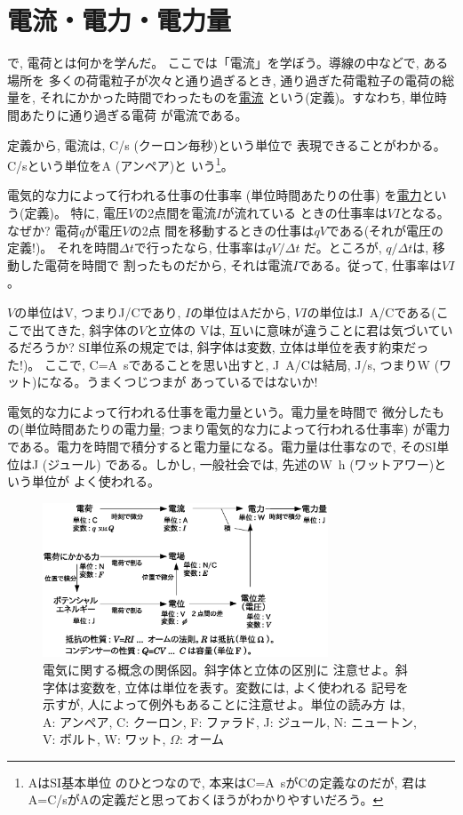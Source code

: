 \section{電流・電力・電力量}

で, 電荷とは何かを学んだ。
ここでは「電流」を学ぼう。導線の中などで, ある場所を
多くの荷電粒子が次々と通り過ぎるとき, 通り過ぎた荷電粒子の電荷の総量を, 
それにかかった時間でわったものを\underline{電流}
という(定義)。すなわち, 単位時間あたりに通り過ぎる電荷
が電流である。

定義から, 電流は, C/s (クーロン毎秒)という単位で
表現できることがわかる。C/sという単位をA (アンペア)と
いう\footnote{AはSI基本単位
のひとつなので, 本来はC=A~sがCの定義なのだが, 君は
A=C/sがAの定義だと思っておくほうがわかりやすいだろう。}。\mv

電気的な力によって行われる仕事の仕事率 (単位時間あたりの仕事)
を\underline{電力}という(定義)。
特に, 電圧$V$の2点間を電流$I$が流れている
ときの仕事率は$VI$となる。なぜか? 電荷$q$が電圧$V$の2点
間を移動するときの仕事は$qV$である(それが電圧の定義!)。
それを時間$\Delta t$で行ったなら, 仕事率は$qV/\Delta t$
だ。ところが, $q/\Delta t$は, 移動した電荷を時間で
割ったものだから, それは電流$I$である。従って, 仕事率は$VI$。

$V$の単位はV, つまりJ/Cであり, $I$の単位はAだから, 
$VI$の単位はJ~A/Cである(ここで出てきた, 斜字体の$V$と立体の
Vは, 互いに意味が違うことに君は気づいているだろうか? 
SI単位系の規定では, 斜字体は変数, 立体は単位を表す約束だった!)。
ここで, C=A~sであることを思い出すと, 
J~A/Cは結局, J/s, つまりW (ワット)になる。うまくつじつまが
あっているではないか!

電気的な力によって行われる仕事を電力量という。電力量を時間で
微分したもの(単位時間あたりの電力量; つまり電気的な力によって行われる仕事率)
が電力である。電力を時間で積分すると電力量になる。電力量は仕事なので, そのSI単位はJ (ジュール)
である。しかし, 一般社会では, 先述のW~h (ワットアワー)という単位が
よく使われる。\mv

\begin{figure}[h]
    \centering
    \includegraphics[width=8.5cm]{electronics.eps}
    \caption{電気に関する概念の関係図。斜字体と立体の区別に
注意せよ。斜字体は変数を, 立体は単位を表す。変数には, よく使われる
記号を示すが, 人によって例外もあることに注意せよ。単位の読み方
は, A: アンペア, C: クーロン, F: ファラド, J: ジュール, 
N: ニュートン, V: ボルト, W: ワット, $\Omega$: オーム}\label{fig:electronics}
\end{figure}

